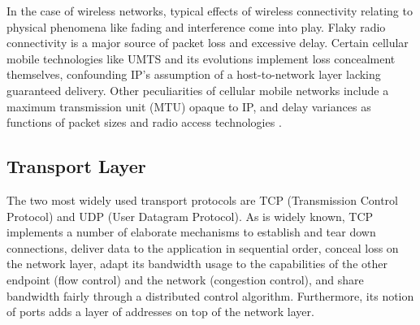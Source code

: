 In the case of wireless networks, typical effects of wireless connectivity relating to physical phenomena like fading and interference come into play. Flaky radio connectivity is a major source of packet loss and excessive delay. Certain cellular mobile technologies like UMTS and its evolutions implement loss concealment themselves, confounding IP's assumption of a host-to-network layer lacking guaranteed delivery. Other peculiarities of cellular mobile networks include a maximum transmission unit (MTU) opaque to IP, and delay variances as functions of packet sizes \cite{Arlos10} and radio access technologies \cite{laner2011dissecting}.


%
%


\subsection{Transport Layer}


The two most widely used transport protocols are TCP (Transmission Control Protocol) and UDP (User Datagram Protocol). As is widely known, TCP implements a number of elaborate mechanisms to establish and tear down connections, deliver data to the application in sequential order, conceal loss on the network layer, adapt its bandwidth usage to the capabilities of the other endpoint (flow control) and the network (congestion control), and share bandwidth fairly through a distributed control algorithm. Furthermore, its notion of ports adds a layer of addresses on top of the network layer.

